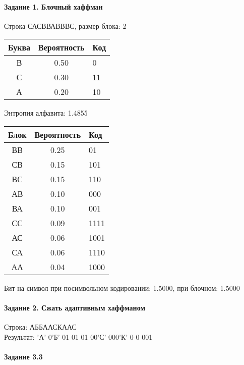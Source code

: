 \documentclass[a4paper, 12pt]{article}
\begin{document}
\paragraph{Задание 1. Блочный хаффман \\}

Строка САСВВАВВВС, размер блока: 2
\begin{center}
 \begin{tabular}{ |c|c|l| } 
  \hline
     Буква & Вероятность & Код\\ \hline
В & 0.50 & 0\\\hline
С & 0.30 & 11\\\hline
А & 0.20 & 10
\\ \hline \end{tabular}
\end{center}
Энтропия алфавита: 1.4855
\begin{center}
 \begin{tabular}{ |c|c|l| } 
  \hline
     Блок & Вероятность & Код\\ \hline
ВВ & 0.25 & 01\\\hline
СВ & 0.15 & 101\\\hline
ВС & 0.15 & 110\\\hline
АВ & 0.10 & 000\\\hline
ВА & 0.10 & 001\\\hline
СС & 0.09 & 1111\\\hline
АС & 0.06 & 1001\\\hline
СА & 0.06 & 1110\\\hline
АА & 0.04 & 1000
\\ \hline \end{tabular}
\end{center}
Бит на символ при посимвольном кодировании: 1.5000, при блочном: 1.5000


\pagebreak
\paragraph{Задание 2. Сжать адаптивным хаффманом\\}

Строка: 
АББААСКААС\\
Результат: 'А' 0'Б' 01 01 01 00'С' 000'К' 0 0 001










\pagebreak

\paragraph{Задание 3.3}
\end{document}
